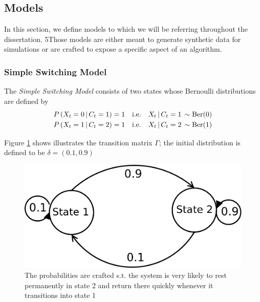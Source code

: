 \subsection{Models}
In this section, we define models to which we will be referring throughout the dissertation. 5Those models are either meant to generate synthetic data for simulations or are crafted to expose a specific aspect of an algorithm.

\subsubsection{Simple Switching Model}
The \textit{Simple Switching Model} consists of two states whose Bernoulli distributions are defined by
\begin{align*}
	P\left(X_t = 0 \, | \, C_t = 1\right) &= 1 \quad
	 \text{i.e.} \quad X_t \, | \, C_t = 1 \, \sim \text{Ber}(0) \\
	P\left(X_t = 1 \, | \, C_t = 2\right) &= 1 \quad
	\text{i.e.} \quad X_t \, | \, C_t = 2 \, \sim \text{Ber}(1)
\end{align*}

Figure \ref{ssm_transitions} shows illustrates the transition matrix $\Gamma$; the initial distribution is defined to be $\delta = (0.1, 0.9)$
\begin{figure}
	\includegraphics[width=\linewidth]{../forward_algorithm/lib/models/simpleSwitchingModel/ssm_transitions.png}
	\caption{The probabilities are crafted s.t. the system is very likely to rest permanently in state 2 and return there quickly whenever it transitions into state 1}
	\label{ssm_transitions}
\end{figure}